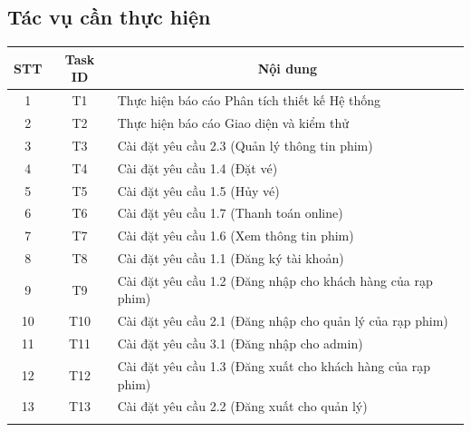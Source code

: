 \documentclass[a4paper, 12pt]{article}
\begin{document}
    \subsection{Tác vụ cần thực hiện}
    \begin{table}[H]
        \begin{center}
            \begin{tabular}{|c|c|l|}
            \hline
            STT & Task ID & \multicolumn{1}{c|}{Nội dung}                               \\ \hline \rowcolor[HTML]{E6B8AF} 
            1   & T1      & Thực hiện báo cáo Phân tích thiết kế Hệ thống               \\ \hline \rowcolor[HTML]{EAD1DC} 
            2   & T2      & Thực hiện báo cáo Giao diện và kiểm thử                     \\ \hline \rowcolor[HTML]{D9EAD3} 
            3   & T3      & Cài đặt yêu cầu 2.3 (Quản lý thông tin phim)                \\ \hline \rowcolor[HTML]{D9EAD3} 
            4   & T4      & Cài đặt yêu cầu 1.4 (Đặt vé)                                \\ \hline \rowcolor[HTML]{D9EAD3} 
            5   & T5      & Cài đặt yêu cầu 1.5 (Hủy vé)                                \\ \hline \rowcolor[HTML]{FFFFFF} 
            6   & T6      & Cài đặt yêu cầu 1.7 (Thanh toán online)                     \\ \hline \rowcolor[HTML]{FFFFFF} 
            7   & T7      & Cài đặt yêu cầu 1.6 (Xem thông tin phim)                    \\ \hline \rowcolor[HTML]{FFFFFF} 
            8   & T8      & Cài đặt yêu cầu 1.1 (Đăng ký tài khoản)                     \\ \hline \rowcolor[HTML]{FFFFFF} 
            9   & T9      & Cài đặt yêu cầu 1.2 (Đăng nhập cho khách hàng của rạp phim) \\ \hline \rowcolor[HTML]{FFFFFF} 
            10  & T10     & Cài đặt yêu cầu 2.1 (Đăng nhập cho quản lý của rạp phim)    \\ \hline \rowcolor[HTML]{FFFFFF} 
            11  & T11     & Cài đặt yêu cầu 3.1 (Đăng nhập cho admin)                   \\ \hline \rowcolor[HTML]{FFFFFF} 
            12  & T12     & Cài đặt yêu cầu 1.3 (Đăng xuất cho khách hàng của rạp phim) \\ \hline \rowcolor[HTML]{FFFFFF} 
            13  & T13     & Cài đặt yêu cầu 2.2 (Đăng xuất cho quản lý)                 \\ \hline \rowcolor[HTML]{FFFFFF} 

\end{tabular}
\end{center}
\end{table}
\end{document}

